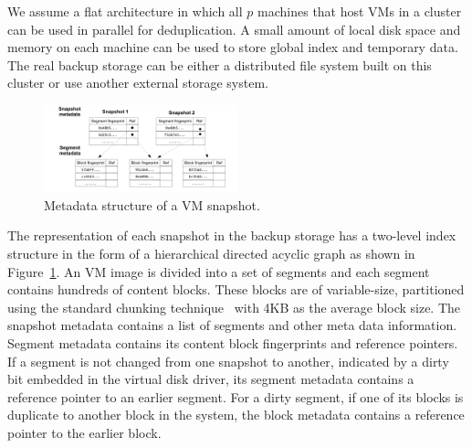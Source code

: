 We assume a flat architecture in which  all $p$ machines that host VMs in a cluster can 
be used in parallel for deduplication. 
A small amount of local disk space and memory on each machine can be used 
to store global index and temporary data. 
The real backup storage can be either a distributed file system built on
this cluster  or use another  external storage system. 



\begin{figure}
\centering
\includegraphics[width=0.5\textwidth]{snapshotdata.pdf}
\caption{ Metadata structure of a VM snapshot.}
\label{fig:snapshot}
\end{figure}

The representation of each snapshot in the backup storage
has a two-level index structure in the form of a hierarchical
directed acyclic graph as shown in Figure~\ref{fig:snapshot}.
An VM image is divided into a set of segments and each  segment contains hundreds of content blocks. 
These blocks are of variable-size, partitioned using
the standard chunking technique~\cite{similar94} with 4KB as the average block size. 
The snapshot metadata  contains a list of segments and other meta data information.
Segment metadata  contains its  content block fingerprints and reference pointers. 
If a segment is not changed from one snapshot to another, indicated by a dirty bit embedded in the virtual disk driver, 
its segment metadata contains a reference pointer to an earlier segment.
For a dirty segment, if one of its blocks is duplicate to another block in the system,  
the block metadata contains a reference pointer to the earlier block.





